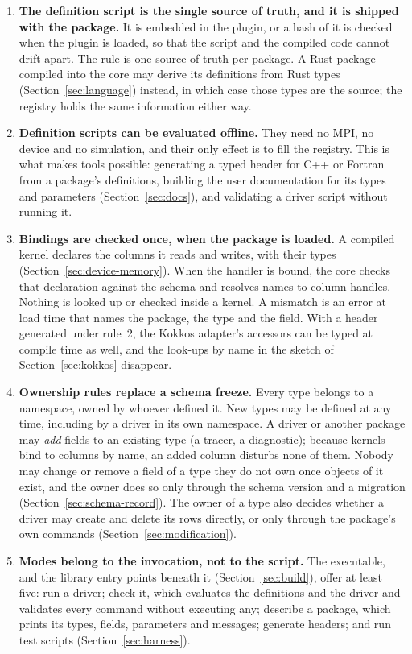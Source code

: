 \documentclass[11pt,a4paper]{article}
\begin{document}
\begin{enumerate}
  \item \textbf{The definition script is the single source of truth, and it
        is shipped with the package.}  It is embedded in the plugin, or a
        hash of it is checked when the plugin is loaded, so that the script
        and the compiled code cannot drift apart.  The rule is one source of
        truth per package.  A Rust package compiled into the core may derive
        its definitions from Rust types (Section~\ref{sec:language})
        instead, in which case those types are the source; the registry
        holds the same information either way.
  \item \textbf{Definition scripts can be evaluated offline.}  They need no
        MPI, no device and no simulation, and their only effect is to fill
        the registry.  This is what makes tools possible: generating a typed
        header for C++ or Fortran from a package's definitions, building
        the user documentation for its types and parameters
        (Section~\ref{sec:docs}), and validating a driver script without
        running it.
  \item \textbf{Bindings are checked once, when the package is loaded.}  A
        compiled kernel declares the columns it reads and writes, with their
        types (Section~\ref{sec:device-memory}).  When the handler is bound,
        the core checks that declaration against the schema and resolves
        names to column handles.  Nothing is looked up or checked inside a
        kernel.  A mismatch is an error at load time that names the package,
        the type and the field.  With a header generated under rule~2, the
        Kokkos adapter's accessors can be typed at compile time as well, and
        the look-ups by name in the sketch of Section~\ref{sec:kokkos}
        disappear.
  \item \textbf{Ownership rules replace a schema freeze.}  Every type belongs
        to a namespace, owned by whoever defined it.  New types may be
        defined at any time, including by a driver in its own namespace.  A
        driver or another package may \emph{add} fields to an existing type
        (a tracer, a diagnostic); because kernels bind to columns by name,
        an added column disturbs none of them.  Nobody may change or remove
        a field of a type they do not own once objects of it exist, and the
        owner does so only through the schema version and a migration
        (Section~\ref{sec:schema-record}).  The owner of a type also decides
        whether a driver may create and delete its rows directly, or only
        through the package's own commands (Section~\ref{sec:modification}).
  \item \textbf{Modes belong to the invocation, not to the script.}  The
        executable, and the library entry points beneath it
        (Section~\ref{sec:build}), offer at least five: run a driver; check
        it, which evaluates the definitions and the driver and validates
        every command without executing any; describe a package, which
        prints its types, fields, parameters and messages; generate
        headers; and run test scripts (Section~\ref{sec:harness}).
\end{enumerate}
\end{document}
